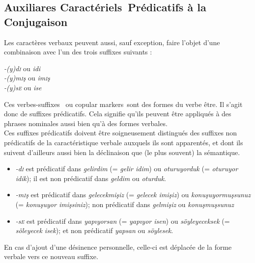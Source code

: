 \documentclass{cours}
\newcommand{\ch}{\c{s}}
\newcommand{\sci}{\textsc{i}}
\newcommand{\sce}{\textsc{e}}
\begin{document}
\subsection{Auxiliares \og Caractériels\fg\ Prédicatifs à la Conjugaison}
Les caractères verbaux peuvent aussi, sauf exception, faire l'objet d'une combinaison avec l'un des trois suffixes suivants :
\begin{center}
    {\sl -(y)d\sci} ou {\sl idi}\\
    \textsl{-(y)m\sci \ch} ou \textsl{im\sci \ch}\\
    \textsl{-(y)s\sce} ou \textsl{ise}
\end{center}
Ces \og verbes-suffixes \fg\ ou \og copular markers\fg\ sont des formes du verbe \og être\fg. Il s'agit donc de suffixes prédicatifs. Cela signifie qu'ils peuvent être appliqués à des phrases nominales aussi bien qu'à des formes verbales.\\
Ces suffixes prédicatifs doivent être soigneusement distingués des suffixes non prédicatifs de la caractéristique verbale auxquels ils sont apparentés, et dont ils suivent d'ailleurs aussi bien la déclinaison que (le plus souvent) la sémantique.
\begin{itemize}
    \item \textsl{-d\sci} est prédicatif dans \textsl{gelirdim} (= {\sl gelir idim}) ou \textsl{oturuyorduk} (= {\sl oturuyor idik}); il est non prédicatif dans \textsl{geldim} ou \textsl{oturduk}.
    \item \textsl{-m\sci \ch} est prédicatif dans \textsl{gelecekmi\ch iz} (= {\sl gelecek imi\ch iz}) ou \textsl{konu\ch uyormu\ch sunuz} (= {\sl konu\ch uyor imi\ch siniz}); non prédicatif dans \textsl{gelmi\ch iz} ou \textsl{konu\ch mu\ch sunuz}
    \item \textsl{-s\sce} est prédicatif dans \textsl{yap\i yorsan} (= {\sl yap\i yor isen}) ou \textsl{söyleyeceksek} (= {\sl söleyecek isek}); et non prédicatif \textsl{yapsan} ou \textsl{söylesek}.
\end{itemize}
En cas d'ajout d'une désinence personnelle, celle-ci est déplacée de la forme verbale vers ce nouveau suffixe. \\
\end{document}
